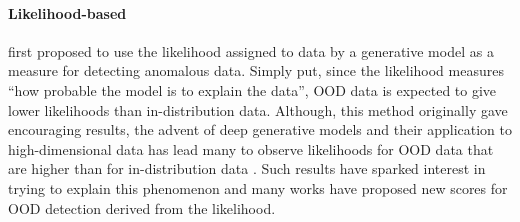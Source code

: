 
\paragraph{Likelihood-based}
%
\textcite{bishop_novelty_1994} first proposed to use the likelihood assigned to data by a generative model as a measure for detecting anomalous data. Simply put, since the likelihood measures ``how probable the model is to explain the data'', OOD data is expected to give lower likelihoods than in-distribution data. Although, this method originally gave encouraging results, the advent of deep generative models and their application to high-dimensional data has lead many to observe likelihoods for OOD data that are higher than for in-distribution data \parencite{choi_waic_2019,nalisnick_detecting_2019,hendrycks_deep_2019,kirichenko_why_2020}. Such results have sparked interest in trying to explain this phenomenon and many works have proposed new scores for OOD detection derived from the likelihood. 


